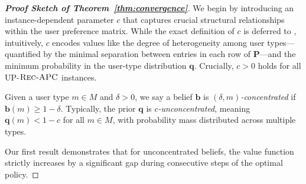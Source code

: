 \begin{proof}[\normalfont\bfseries Proof Sketch of Theorem~\ref{thm:convergence}]
We begin by introducing an instance-dependent parameter $c$ that captures crucial structural 
relationships within the user preference matrix. While the exact definition of $c$ is deferred 
to , intuitively, $c$ encodes values like the degree of heterogeneity among user types---quantified by the minimal separation between entries in each 
row of $\bm{P}$---and the minimum probability in the user-type distribution $\bm{q}$. Crucially, 
$c > 0$ holds for all UP-$\textsc{Rec-APC}$ instances.


Given a user type $m \in M$ and $\delta > 0$, we say a belief $\bm{b}$ is \emph{$(\delta,m)$-concentrated} if $\bm{b}(m) \geq 1-\delta$. Typically, the prior $\bm{q}$ is \emph{$c$-unconcentrated}, meaning $\bm{q}(m) < 1-c$ for all $m \in M$, with probability mass distributed across multiple types.

Our first result demonstrates that for unconcentrated beliefs, the value function strictly increases by a significant gap during consecutive steps of the optimal policy.


\end{proof}
